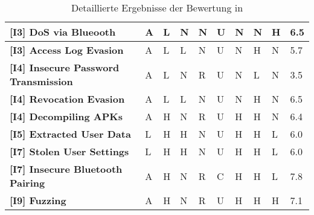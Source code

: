 \begin{sidewaystable}
\begin{tabularx}{\textwidth}{|l|X|X|X|X|X|X|X|X|l|}
\textbf{{[}I3{]} DoS via Blueooth}                   & A           & L           & N           & N           & U          & N          & N          & H          & 6.5            \\ \hline
\textbf{{[}I3{]} Access Log Evasion}                 & A           & L           & L           & N           & U          & N          & H          & N          & 5.7            \\ \hline
\textbf{{[}I4{]} Insecure Password Transmission}     & A           & L           & N           & R           & U          & N          & L          & N          & 3.5            \\ \hline
\textbf{{[}I4{]} Revocation Evasion}                 & A           & L           & L           & N           & U          & N          & H          & N          & 6.5            \\ \hline
\textbf{{[}I4{]} Decompiling APKs}                   & A           & H           & N           & R           & U          & H          & H          & N          & 6.4            \\ \hline
\textbf{{[}I5{]} Extracted User Data}                & L           & H           & H           & N           & U          & H          & H          & L          & 6.0            \\ \hline
\textbf{{[}I7{]} Stolen User Settings}               & L           & H           & H           & N           & U          & H          & H          & L          & 6.0            \\ \hline
\textbf{{[}I7{]} Insecure Bluetooth Pairing}         & A           & H           & N           & R           & C          & H          & H          & L          & 7.8            \\ \hline
\textbf{{[}I9{]} Fuzzing}                            & A           & H           & N           & R           & U          & H          & H          & H          & 7.1            \\ \hline
\end{tabularx}
\caption{Detaillierte Ergebnisse der Bewertung in }
\label{tab:analysis_cvss_long}
\end{sidewaystable}
\newpage


